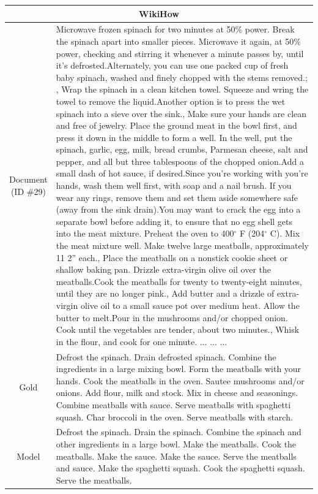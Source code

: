 \begin{table}[bth!]
\scriptsize
\centering
\renewcommand{\arraystretch}{1.3}
\begin{tabular}{c|p{}}
\hline
\multicolumn{2}{c}{WikiHow} \\ \hline
\makecell{Document\\(ID \#29)} & 
Microwave frozen spinach for two minutes at 50\% power. Break the spinach apart into smaller pieces. Microwave it again, at 50\% power, checking and stirring it whenever a minute passes by, until it’s defrosted.Alternately, you can use one packed cup of fresh baby spinach, washed and finely chopped with the stems removed.; , Wrap the spinach in a clean kitchen towel. Squeeze and wring the towel to remove the liquid.Another option is to press the wet spinach into a sieve over the sink., Make sure your hands are clean and free of jewelry. Place the ground meat in the bowl first, and press it down in the middle to form a well. In the well, put the spinach, garlic, egg, milk, bread crumbs, Parmesan cheese, salt and pepper, and all but three tablespoons of the chopped onion.Add a small dash of hot sauce, if desired.Since you’re working with you’re hands, wash them well first, with soap and a nail brush. If you wear any rings, remove them and set them aside somewhere safe (away from the sink drain).You may want to crack the egg into a separate bowl before adding it, to ensure that no egg shell gets into the meat mixture. Preheat the oven to 400$^\circ$ F (204$^\circ$ C). Mix the meat mixture well. Make twelve large meatballs, approximately 11  2” each., Place the meatballs on a nonstick cookie sheet or shallow baking pan. Drizzle extra-virgin olive oil over the meatballs.Cook the meatballs for twenty to twenty-eight minutes, until they are no longer pink., Add butter and a drizzle of extra-virgin olive oil to a small sauce pot over medium heat. Allow the butter to melt.Pour in the mushrooms and/or chopped onion. Cook until the vegetables are tender, about two minutes., Whisk in the flour, and cook for one minute. ... ... ... 
\\ \hline
Gold & 
Defrost the spinach. Drain defrosted spinach. Combine the ingredients in a large mixing bowl. Form the meatballs with your hands. Cook the meatballs in the oven. Sautee mushrooms and/or onions. Add flour, milk and stock. Mix in cheese and seasonings. Combine meatballs with sauce. Serve meatballs with spaghetti squash. Char broccoli in the oven. Serve meatballs with starch.
\\ \hline
Model & 
Defrost the spinach. Drain the spinach. Combine the spinach and other ingredients in a large bowl. Make the meatballs. Cook the meatballs. Make the sauce. Make the sauce. Serve the meatballs and sauce. Make the spaghetti squash. Cook the spaghetti squash. Serve the meatballs.

\end{tabular}
\end{table}
